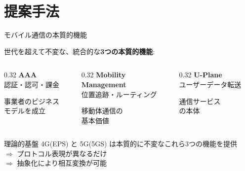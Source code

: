 \documentclass[dvipdfmx,11pt,aspectratio=169]{beamer}
\begin{document}
\section{提案手法}
\begin{frame}{モバイル通信の本質的機能}
  \begin{block}{}
    世代を超えて不変な、統合的な\textbf{3つの本質的機能}:
  \end{block}

  \begin{columns}[T]
    \begin{column}{0.32\textwidth}
      \centering
      \textbf{AAA}\\\small
      認証・認可・課金
      \vspace{0.3cm}

      事業者のビジネス\\モデルを成立
    \end{column}
    \begin{column}{0.32\textwidth}
      \centering
      \textbf{Mobility\\Management}\\\small
      位置追跡・ルーティング
      \vspace{0.3cm}

      移動体通信の\\基本価値
    \end{column}
    \begin{column}{0.32\textwidth}
      \centering
      \textbf{U-Plane}\\\small
      ユーザーデータ転送
      \vspace{0.3cm}

      通信サービス\\の本体
    \end{column}
  \end{columns}

  \vspace{0.4cm}
  \begin{alertblock}{理論的基盤}
    \centering
    \small
    4G(EPS) と 5G(5GS) は本質的に不変なこれら3つの機能を提供 \\
    $\Rightarrow$ プロトコル表現が異なるだけ \\
    $\Rightarrow$ 抽象化により相互変換が可能
  \end{alertblock}
\end{frame}
\end{document}
